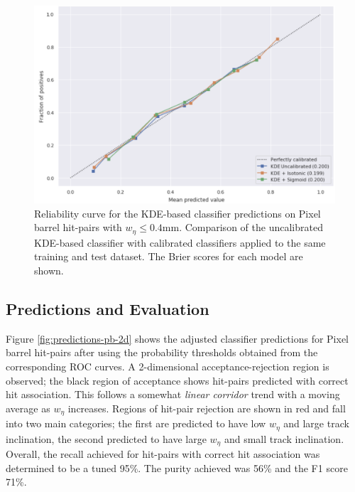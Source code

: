 \begin{figure}[!htbp]
\centering
\includegraphics[width=0.88\linewidth]{images/4-ml-based-predictor/calibration.png}
\caption{Reliability curve for the KDE-based classifier predictions on Pixel barrel hit-pairs with $ w_{\eta} \leq 0.4$mm. Comparison of the uncalibrated KDE-based classifier with calibrated classifiers applied to the same training and test dataset. The Brier scores for each model are shown.}
\label{fig:calibration}
\end{figure}


\subsection{Predictions and Evaluation}

Figure \ref{fig:predictions-pb-2d} shows the adjusted classifier predictions for Pixel barrel hit-pairs after using the probability thresholds obtained from the corresponding ROC curves. A 2-dimensional acceptance-rejection region is observed; the black region of acceptance shows hit-pairs predicted with correct hit association. This follows a somewhat \textit{linear corridor} trend with a moving average as $w_{\eta}$ increases. Regions of hit-pair rejection are shown in red and fall into two main categories; the first are predicted to have low $w_{\eta}$ and large track inclination, the second predicted to have large $w_{\eta}$ and small track inclination. Overall, the recall achieved for hit-pairs with correct hit association was determined to be a tuned 95\%. The purity achieved was 56\% and the F1 score 71\%. 


